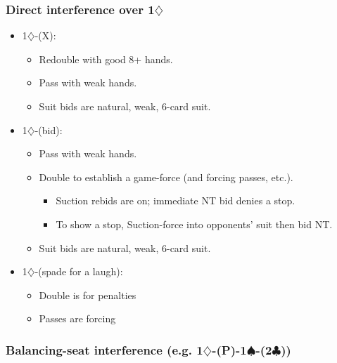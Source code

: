 \documentclass[a4paper,14pt]{extarticle}
\begin{document}
\subsubsection{Direct interference over 1$\diamondsuit$}
\label{sec:intf:1d}

\begin{itemize}
\item 1$\diamondsuit$-(X):
	\begin{itemize}
   \item Redouble with good 8+ hands.
   \item Pass with weak hands.
   \item Suit bids are natural, weak, 6-card suit.
	\end{itemize}
\item 1$\diamondsuit$-(bid):
	\begin{itemize}
   \item Pass with weak hands.
   \item Double to establish a game-force (and forcing passes, etc.).
		\begin{itemize}
      \item Suction rebids are on; immediate NT bid denies a stop.
      \item To show a stop, Suction-force into opponents' suit then bid NT.
		\end{itemize}
   \item Suit bids are natural, weak, 6-card suit.
	\end{itemize}
\item 1$\diamondsuit$-(spade for a laugh):
	\begin{itemize}
   \item Double is for penalties
   \item Passes are forcing
	\end{itemize}
\end{itemize}

\subsubsection{Balancing-seat interference (e.g. 1$\diamondsuit$-(P)-1$\spadesuit$-(2$\clubsuit$))}
\label{sec:intf:bal}
\end{document}
